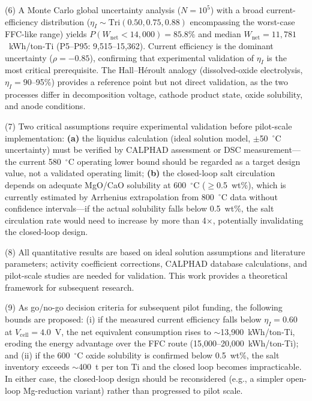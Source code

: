 \documentclass[sn-mathphys,Numbered]{sn-jnl}
\begin{document}
(6) A Monte Carlo global uncertainty analysis ($N = 10^5$) with a broad current-efficiency distribution ($\eta_I \sim \mathrm{Tri}(0.50, 0.75, 0.88)$ encompassing the worst-case FFC-like range) yields $P(W_{\mathrm{net}} < 14{,}000) = 85.8\%$ and median $W_{\mathrm{net}} = 11{,}781$~kWh/ton-Ti (P5--P95: 9{,}515--15{,}362). Current efficiency is the dominant uncertainty ($\rho = -0.85$), confirming that experimental validation of $\eta_I$ is the most critical prerequisite. The Hall--H\'eroult analogy (dissolved-oxide electrolysis, $\eta_I = 90$--95\%) \cite{kvande2014} provides a reference point but not direct validation, as the two processes differ in decomposition voltage, cathode product state, oxide solubility, and anode conditions.

(7) Two critical assumptions require experimental validation before pilot-scale implementation: \textbf{(a)} the liquidus calculation (ideal solution model, $\pm$50~$^{\circ}$C uncertainty) must be verified by CALPHAD assessment or DSC measurement---the current 580~$^{\circ}$C operating lower bound should be regarded as a target design value, not a validated operating limit; \textbf{(b)} the closed-loop salt circulation depends on adequate MgO/CaO solubility at 600~$^{\circ}$C ($\geq$0.5~wt\%), which is currently estimated by Arrhenius extrapolation from 800~$^{\circ}$C data without confidence intervals---if the actual solubility falls below 0.5~wt\%, the salt circulation rate would need to increase by more than 4$\times$, potentially invalidating the closed-loop design.

(8) All quantitative results are based on ideal solution assumptions and literature parameters; activity coefficient corrections, CALPHAD database calculations, and pilot-scale studies are needed for validation. This work provides a theoretical framework for subsequent research.

(9) As go/no-go decision criteria for subsequent pilot funding, the following bounds are proposed: (i) if the measured current efficiency falls below $\eta_I = 0.60$ at $V_{\mathrm{cell}} = 4.0$~V, the net equivalent consumption rises to $\sim$13{,}900~kWh/ton-Ti, eroding the energy advantage over the FFC route (15{,}000--20{,}000~kWh/ton-Ti); and (ii) if the 600~$^{\circ}$C oxide solubility is confirmed below 0.5~wt\%, the salt inventory exceeds $\sim$400~t per ton Ti and the closed loop becomes impracticable. In either case, the closed-loop design should be reconsidered (e.g., a simpler open-loop Mg-reduction variant) rather than progressed to pilot scale.
\end{document}
